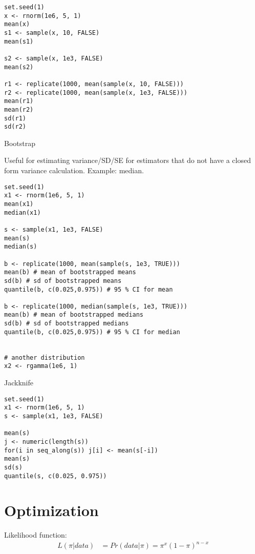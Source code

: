 \documentclass[a4paper,12pt]{article}
\begin{document}



\begin{lstlisting}
set.seed(1)
x <- rnorm(1e6, 5, 1)
mean(x)
s1 <- sample(x, 10, FALSE)
mean(s1)

s2 <- sample(x, 1e3, FALSE)
mean(s2)

r1 <- replicate(1000, mean(sample(x, 10, FALSE)))
r2 <- replicate(1000, mean(sample(x, 1e3, FALSE)))
mean(r1)
mean(r2)
sd(r1)
sd(r2)
\end{lstlisting}

Bootstrap

Useful for estimating variance/SD/SE for estimators that do not have a closed form variance calculation. Example: median.

\begin{lstlisting}
set.seed(1)
x1 <- rnorm(1e6, 5, 1)
mean(x1)
median(x1)

s <- sample(x1, 1e3, FALSE)
mean(s)
median(s)

b <- replicate(1000, mean(sample(s, 1e3, TRUE)))
mean(b) # mean of bootstrapped means
sd(b) # sd of bootstrapped means
quantile(b, c(0.025,0.975)) # 95 % CI for mean

b <- replicate(1000, median(sample(s, 1e3, TRUE)))
mean(b) # mean of bootstrapped medians
sd(b) # sd of bootstrapped medians
quantile(b, c(0.025,0.975)) # 95 % CI for median


# another distribution
x2 <- rgamma(1e6, 1)

\end{lstlisting}


Jackknife

\begin{lstlisting}
set.seed(1)
x1 <- rnorm(1e6, 5, 1)
s <- sample(x1, 1e3, FALSE)

mean(s)
j <- numeric(length(s))
for(i in seq_along(s)) j[i] <- mean(s[-i])
mean(s)
sd(s)
quantile(s, c(0.025, 0.975))

\end{lstlisting}



\clearpage
\section{Optimization}

Likelihood function:
\begin{align*}
L(\pi|data) & = Pr(data|\pi) = \pi^x(1-\pi)^{n-x}
\end{align*}
\end{document}
